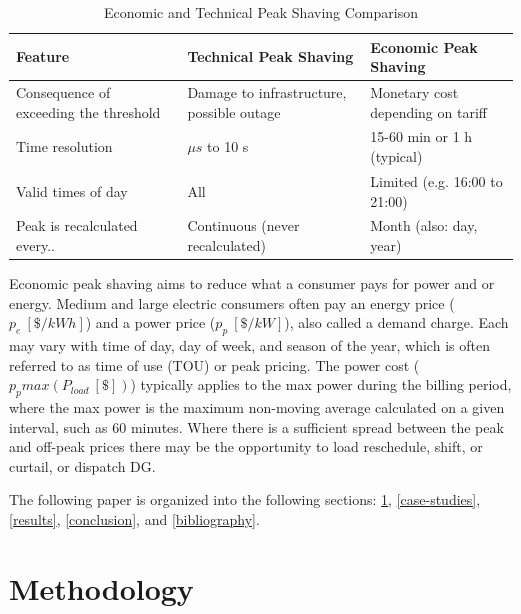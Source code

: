 \documentclass[journal,article,submit,pdftex,moreauthors]{Definitions/mdpi}
\begin{document}
\begin{table}
  \centering
  \caption{Economic and Technical Peak Shaving Comparison}
  \label{tab:econ-tech-peak-shaving}
  \begin{tabularx}{\textwidth}{XXX}
    \toprule
    Feature                                & Technical Peak Shaving                    & Economic Peak Shaving             \\
    \midrule
    Consequence of exceeding the threshold & Damage to infrastructure, possible outage & Monetary cost depending on tariff \\
    Time resolution                        & $\mu s$ to 10 s                           & 15-60 min or 1 h (typical)        \\
    Valid times of day                     & All                                       & Limited (e.g. 16:00 to 21:00)     \\
    Peak is recalculated every..           & Continuous (never recalculated)           & Month (also: day, year)        \\
    \bottomrule
  \end{tabularx}
\end{table}


Economic peak shaving aims to reduce what a consumer pays for power and or energy. Medium and large electric consumers often pay an energy price ($p_e\ [\$/kWh]$) and a power price ($p_p\ [\$/kW]$), also called a demand charge. Each may vary with time of day, day of week, and season of the year, which is often referred to as time of use (TOU) or peak pricing. The power cost ($p_p max(P_{load}\ [\$])$) typically applies to the max power during the billing period, where the max power is the maximum non-moving average calculated on a given interval, such as 60 minutes. Where there is a sufficient spread between the peak and off-peak prices there may be the opportunity to load reschedule, shift, or curtail, or dispatch DG.

The following paper is organized into the following sections: \ref{methodology}, \ref{case-studies}, \ref{results}, \ref{conclusion}, and \ref{bibliography}.


\section{Methodology}\label{methodology}%
\end{document}
